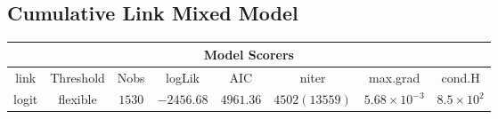 \subsection{Cumulative Link Mixed Model}

\begin{minipage}{\linewidth}
\begin{tabular}{|c|c|c|c|c|c|c|c|}
\hline
\multicolumn{8}{|c|}{Model Scorers}\\\hline
link  &  Threshold & Nobs & logLik & AIC & niter & max.grad & cond.H\\\hline
logit & flexible & $1530$ & $-2456.68$ & $4961.36$ & $4502(13559)$ & $5.68\times 10^{-3}$ & $8.5\times 10^{2}$\\\hline
\end{tabular}
\label{tab:modrand}
\end{minipage}
\newline
\newline
\newline
\newline
